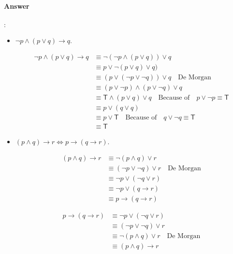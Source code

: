 \documentclass{article}
\begin{document}
\paragraph{Answer}:

\begin{itemize}
  \item $\lnot p \land (p \lor q) \to q$.
  
\begin{equation*}
  \begin{aligned}
    \lnot p \land (p \lor q) \to q &\equiv \lnot(\lnot p \land ( p \lor q )) \lor q \\
    &\equiv p \lor \lnot (p \lor q) \lor q) \\
    &\equiv (p \lor (\lnot p \lor \lnot q)) \lor q \quad \text{De Morgan}\\
    &\equiv (p \lor \lnot p) \land (p \lor \lnot q) \lor q\\
    &\equiv \mathsf{T} \land (p \lor q) \lor q \quad \text{Because of} \quad p \lor \lnot p \equiv \mathsf{T} \\
    &\equiv p \lor (q \lor q) \\
    &\equiv p \lor \mathsf{T} \quad \text{Because of} \quad q \lor \lnot q \equiv \mathsf{T} \\
    &\equiv \mathsf{T}
  \end{aligned}
\end{equation*}

  \item $(p \land q) \to r \Leftrightarrow p \to (q \to r) $.
  
\begin{equation*}
  \begin{aligned}
    (p \land q) \to r &\equiv \lnot (p \land q) \lor r\\
    &\equiv (\lnot p \lor \lnot q) \lor r \quad \text{De Morgan}\\
    &\equiv \lnot p \lor (\lnot q \lor r)\\
    &\equiv \lnot p \lor (q \to r)\\
    &\equiv p \to (q \to r)
  \end{aligned}
\end{equation*}

\begin{equation*}
  \begin{aligned}
    p \to (q \to r) &\equiv \lnot p \lor (\lnot q \lor r )\\
    &\equiv (\lnot p \lor \lnot q) \lor r\\
    &\equiv \lnot(p \land q) \lor r \quad \text{De Morgan}\\
    &\equiv (p \land q) \to r
  \end{aligned}
\end{equation*}
  

\end{itemize}
\end{document}

